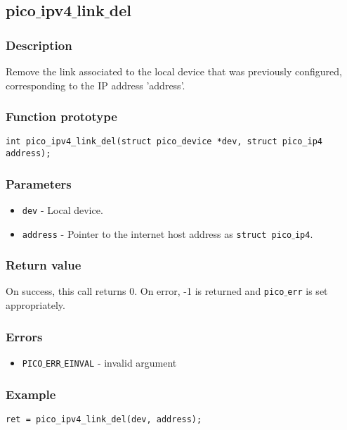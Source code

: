 \subsection{pico$\_$ipv4$\_$link$\_$del}

\subsubsection*{Description}
Remove the link associated to the local device that was previously configured, corresponding to the IP address 'address'.

\subsubsection*{Function prototype}
\begin{verbatim}
int pico_ipv4_link_del(struct pico_device *dev, struct pico_ip4 address); 
\end{verbatim}

\subsubsection*{Parameters}
\begin{itemize}[noitemsep]
\item \texttt{dev} - Local device.
\item \texttt{address} - Pointer to the internet host address as \texttt{struct pico$\_$ip4}.
\end{itemize}

\subsubsection*{Return value}
On success, this call returns 0.
On error, -1 is returned and \texttt{pico$\_$err} is set appropriately.

\subsubsection*{Errors}
\begin{itemize}[noitemsep]
\item \texttt{PICO$\_$ERR$\_$EINVAL} - invalid argument
\end{itemize}

\subsubsection*{Example}
\begin{verbatim}
ret = pico_ipv4_link_del(dev, address);
\end{verbatim}



